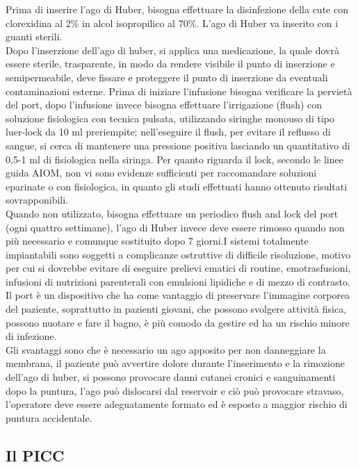 Prima di inserire l’ago di Huber, bisogna effettuare la disinfezione della cute con clorexidina al 2\% 
in alcol isopropilico al 70\%. 
L’ago di Huber va inserito con i guanti sterili\cite{GAVECELTracc2021}.\\
Dopo l’inserzione dell’ago di huber, si applica una medicazione, la quale dovrà essere sterile, trasparente, 
in modo da rendere visibile il punto di inserzione e semipermeabile, deve fissare e proteggere il punto di inserzione 
da eventuali contaminazioni esterne. Prima di iniziare l’infusione bisogna verificare la pervietà del port, 
dopo l’infusione invece bisogna effettuare l’irrigazione (flush) con soluzione fisiologica con tecnica pulsata, 
utilizzando siringhe monouso di tipo luer-lock da 10 ml preriempite; nell’eseguire il flush, per evitare il reflusso 
di sangue, si cerca di mantenere una pressione positiva lasciando un quantitativo di 0,5-1 ml di fisiologica nella 
siringa. Per quanto riguarda il lock, secondo le linee guida AIOM, non vi sono evidenze sufficienti per raccomandare 
soluzioni eparinate o con fisiologica, in quanto gli studi effettuati hanno ottenuto risultati sovrapponibili\cite{AIOMCVC}.\\
Quando non utilizzato, bisogna effettuare un periodico flush and lock del port (ogni quattro settimane), l’ago di Huber
invece deve essere rimosso quando non più necessario e comunque sostituito dopo 7 giorni.I sistemi totalmente 
impiantabili sono soggetti a complicanze ostruttive di difficile risoluzione, motivo per cui si dovrebbe evitare di 
eseguire prelievi ematici di routine, emotrasfusioni, infusioni di nutrizioni parenterali con emulsioni lipidiche e 
di mezzo di contrasto\cite{GAVECELTracc2021}.\\
Il port è un dispositivo che ha come vantaggio di preservare l’immagine corporea del paziente, soprattutto in pazienti 
giovani, che possono svolgere attività fisica, possono nuotare e fare il bagno, è più comodo da gestire ed ha un 
rischio minore di infezione.\\ 
Gli svantaggi sono che è necessario un ago apposito per non danneggiare la membrana, il paziente può avvertire dolore 
durante l’inserimento e la rimozione dell’ago di huber, si possono provocare danni cutanei cronici e sanguinamenti 
dopo la puntura, l’ago può dislocarsi dal reservoir e ciò può provocare stravaso, l’operatore deve essere 
adeguatamente formato ed è esposto a maggior rischio di puntura accidentale\cite{LINEEGUIDA}.\\

\subsection{Il PICC}

